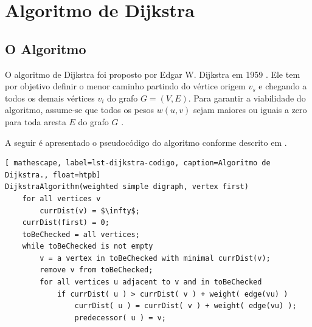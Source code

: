 \chapter{Algoritmo de Dijkstra}
\label{sec-dijkstra}

\section{O Algoritmo}
\label{sec-dijkstra-algoritmo}
O algoritmo de Dijkstra foi proposto por Edgar W. Dijkstra em 1959 \cite{dijkstra1959note}. Ele tem por objetivo definir o menor caminho partindo do vértice origem $v_{s}$ e chegando a todos os demais vértices $v_{i}$ do grafo $G = (V,E)$. Para garantir a viabilidade do algoritmo, assume-se que todos os pesos $w( u, v )$ sejam maiores ou iguais a zero para toda aresta $E$ do grafo $G$ \cite{cormen2009introduction}.

A seguir é apresentado o pseudocódigo do algoritmo conforme descrito em .

\begin{lstlisting}[ mathescape, label=lst-dijkstra-codigo, caption=Algoritmo de Dijkstra., float=htpb]
DijkstraAlgorithm(weighted simple digraph, vertex first)
	for all vertices v
		currDist(v) = $\infty$;
	currDist(first) = 0;
	toBeChecked = all vertices;
	while toBeChecked is not empty
		v = a vertex in toBeChecked with minimal currDist(v);
		remove v from toBeChecked;
		for all vertices u adjacent to v and in toBeChecked
			if currDist( u ) > currDist( v ) + weight( edge(vu) )
				currDist( u ) = currDist( v ) + weight( edge(vu) );
				predecessor( u ) = v;
\end{lstlisting}


